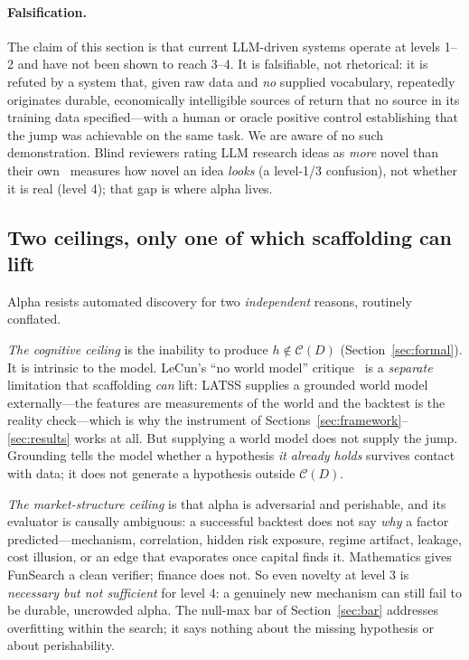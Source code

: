 \paragraph{Falsification.} The claim of this section is that current LLM-driven systems operate at
levels 1--2 and have not been shown to reach 3--4. It is falsifiable, not rhetorical: it is refuted
by a system that, given raw data and \emph{no} supplied vocabulary, repeatedly originates durable,
economically intelligible sources of return that no source in its training data specified---with a
human or oracle positive control establishing that the jump was achievable on the same task. We are
aware of no such demonstration. Blind reviewers rating LLM research ideas as \emph{more} novel than
their own~\cite{si2024} measures how novel an idea \emph{looks} (a level-1/3 confusion), not whether
it is real (level 4); that gap is where alpha lives.

\subsection{Two ceilings, only one of which scaffolding can lift}
\label{sec:two-ceilings}

Alpha resists automated discovery for two \emph{independent} reasons, routinely conflated.

\emph{The cognitive ceiling} is the inability to produce $h \notin \mathcal{C}(D)$ (Section~\ref{sec:formal}).
It is intrinsic to the model. LeCun's ``no world model'' critique~\cite{lecun,lecunmtr} is a
\emph{separate} limitation that scaffolding \emph{can} lift: LATSS supplies a grounded world model
externally---the features are measurements of the world and the backtest is the reality check---which
is why the instrument of Sections~\ref{sec:framework}--\ref{sec:results} works at all. But supplying a
world model does not supply the jump. Grounding tells the model whether a hypothesis \emph{it already
holds} survives contact with data; it does not generate a hypothesis outside $\mathcal{C}(D)$.

\emph{The market-structure ceiling} is that alpha is adversarial and perishable, and its evaluator is
causally ambiguous: a successful backtest does not say \emph{why} a factor predicted---mechanism,
correlation, hidden risk exposure, regime artifact, leakage, cost illusion, or an edge that
evaporates once capital finds it. Mathematics gives FunSearch a clean verifier; finance does not. So
even novelty at level 3 is \emph{necessary but not sufficient} for level 4: a genuinely new mechanism
can still fail to be durable, uncrowded alpha. The null-max bar of Section~\ref{sec:bar} addresses
overfitting within the search; it says nothing about the missing hypothesis or about perishability.

